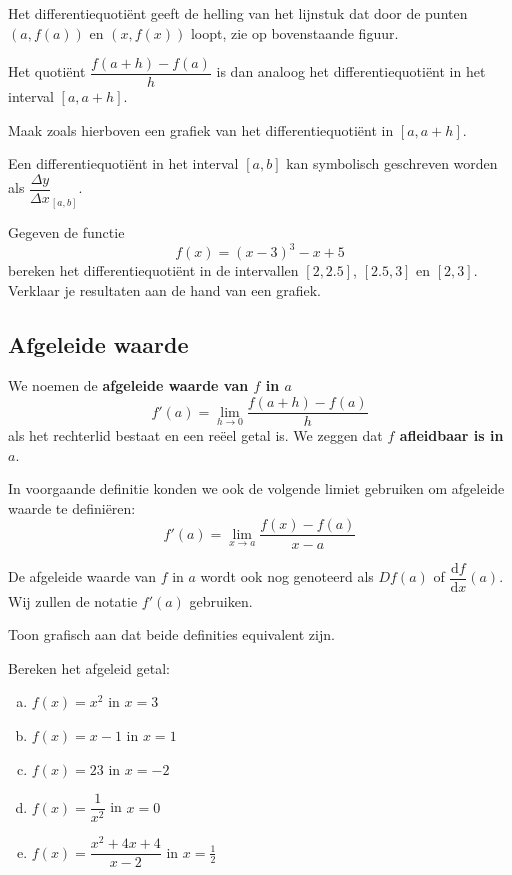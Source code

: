 \documentclass[12pt]{article}
\newenvironment{definitie}
{
  \begin{mdframed}[nobreak=true,frametitle={Definitie}]
  }{%
  \end{mdframed}
}
\begin{document}
Het differentiequotiënt geeft de helling van het lijnstuk dat door de punten $(a,f(a))$ en $(x,f(x))$ loopt, zie op bovenstaande figuur.

Het quotiënt $\dfrac{f(a+h)-f(a)}{h}$ is dan analoog het differentiequotiënt in het interval $[a, a+h]$.

\begin{oefening}
  Maak zoals hierboven een grafiek van het differentiequotiënt in $[a, a+h]$.
\end{oefening}

Een differentiequotiënt in het interval $[a,b]$ kan symbolisch geschreven worden als $\dfrac{\Delta y}{\Delta x}_{[a,b]}$.

\begin{oefening}
  Gegeven de functie
  $$f(x)=(x-3)^3-x+5$$
  bereken het differentiequotiënt in de intervallen $[2,2.5]$, $[2.5,3]$ en $[2,3]$. Verklaar je resultaten aan de hand van een grafiek.

\end{oefening}

\subsection{Afgeleide waarde}
\begin{definitie}
  We noemen de {\bf afgeleide waarde van $f$ in $a$}
  $$f'(a)=\lim_{h\to 0}\dfrac{f(a+h)-f(a)}{h}$$
  als het rechterlid bestaat en een reëel getal is. We zeggen dat {\bf $f$ afleidbaar is in $a$}.
\end{definitie}

In voorgaande definitie konden we ook de volgende limiet gebruiken om afgeleide waarde te definiëren:
$$f'(a)=\lim_{x\to a}\dfrac{f(x)-f(a)}{x-a}$$

De afgeleide waarde van $f$ in $a$ wordt ook nog genoteerd als $Df(a)$ of $\dfrac{\mbox{d}f}{\mbox{d}x}(a)$. Wij zullen de notatie $f'(a)$ gebruiken.

\begin{oefening}
  Toon grafisch aan dat beide definities equivalent zijn.
\end{oefening}

\begin{oefening}
  Bereken het afgeleid getal:
  \begin{enumerate}[(a)]
  \item $f(x)=x^2$ in $x=3$
  \item $f(x)=x-1$ in $x=1$
  \item $f(x)=23$ in $x=-2$
  \item $f(x)=\dfrac{1}{x^2}$ in $x=0$
  \item $f(x)=\dfrac{x^2+4x+4}{x-2}$ in $x=\frac{1}{2}$
  \end{enumerate}
\end{oefening}
\end{document}
